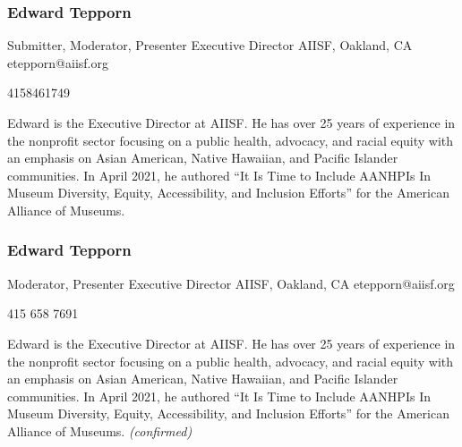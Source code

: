 \documentclass{report}
\begin{document}
              \subsubsection*{ Edward Tepporn }
              Submitter, Moderator, Presenter\newline
              Executive Director\newline
              AIISF, Oakland, CA
              \newline
              etepporn@aiisf.org\newline
              
              4158461749\newline

              Edward is the Executive Director at AIISF. He has over 25 years of experience in the nonprofit sector focusing on a public health, advocacy, and racial equity with an emphasis on Asian American, Native Hawaiian, and Pacific Islander communities. In April 2021, he authored “It Is Time to Include AANHPIs In Museum Diversity, Equity, Accessibility, and Inclusion Efforts” for the American Alliance of Museums.\newline


              
                \subsubsection*{ Edward Tepporn }
                Moderator, Presenter\newline
                Executive Director\newline
                AIISF, Oakland, CA
                \newline
                etepporn@aiisf.org\newline
                
                415 658 7691\newline

                Edward is the Executive Director at AIISF. He has over 25 years of experience in the nonprofit sector focusing on a public health, advocacy, and racial equity with an emphasis on Asian American, Native Hawaiian, and Pacific Islander communities. In April 2021, he authored “It Is Time to Include AANHPIs In Museum Diversity, Equity, Accessibility, and Inclusion Efforts” for the American Alliance of Museums.\newline
                \emph{ (confirmed) }
              
\end{document}
